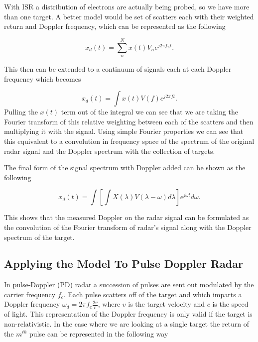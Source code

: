 With ISR a distribution of electrons are actually being probed, so we have more than one target. A better model would be set of scatters each with their weighted return and Doppler frequency, which can be represented as the following

\begin{equation}
\label{multiDop}
\displaystyle x_d(t) = \sum_{n}^{N} x(t)V_ne^{j2\pi f_{n} t}.
\end{equation}

\noindent This then can be extended to a continuum of signals each at each Doppler frequency which becomes

\begin{equation}
\label{conDop}
x_d(t) = \int x(t) V(f)e^{j2\pi ft}.
\end{equation}
\noindent Pulling the $x(t)$ term out of the integral we can see that we are taking the Fourier transform of this relative weighting between each of the scatters and then multiplying it with the signal.  Using simple Fourier properties we can see that this equivalent to a convolution in frequency space of the spectrum of the original radar signal and the Doppler spectrum with the collection of targets.  

The final form of the signal spectrum with Doppler added can be shown as the following

\begin{equation}
\label{finalDop}
x_d(t) = \int \left[\int X(\lambda)V(\lambda-\omega)d\lambda\right] e^{j\omega t}d\omega.
\end{equation}

\noindent This shows that the measured Doppler on the radar signal can be formulated as the convolution of the Fourier transform of radar's signal along with the Doppler spectrum of the target.

\subsection{Applying the Model To Pulse Doppler Radar}

In pulse-Doppler (PD) radar a succession of pulses are sent out modulated by the carrier frequency $f_c$.  Each pulse scatters off of the target and which imparts a Doppler frequency $\omega_d = 2\pi f_c \frac{2v}{c}$, where $v$ is the target velocity and $c$ is the speed of light.  This representation of the Doppler frequency is only valid if the target is non-relativistic.  In the case where we are looking at a single target the return of the $m^{th}$ pulse can be represented in the following way\cite{richards:fundamentalsigproc}

